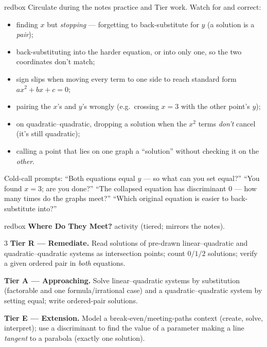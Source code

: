 \documentclass[10pt]{article}
\begin{document}
\begin{skillbox}{redbox}
Circulate during the notes practice and Tier work. Watch for and correct:
\begin{itemize}[leftmargin=1.2em, nosep]
  \item finding $x$ but \emph{stopping} --- forgetting to back-substitute for $y$ (a solution is a \emph{pair});
  \item back-substituting into the harder equation, or into only one, so the two coordinates don't match;
  \item sign slips when moving every term to one side to reach standard form $ax^2+bx+c=0$;
  \item pairing the $x$'s and $y$'s wrongly (e.g.\ crossing $x=3$ with the other point's $y$);
  \item on quadratic--quadratic, dropping a solution when the $x^2$ terms \emph{don't} cancel (it's still quadratic);
  \item calling a point that lies on one graph a ``solution'' without checking it on the \emph{other}.
\end{itemize}
Cold-call prompts: ``Both equations equal $y$ --- so what can you set equal?'' ``You found $x=3$; are you done?''
``The collapsed equation has discriminant $0$ --- how many times do the graphs meet?'' ``Which original equation is
easier to back-substitute into?''
\end{skillbox}

\begin{skillbox}{redbox}
\textbf{Where Do They Meet?} activity (tiered; mirrors the notes).
\begin{multicols}{3}
\textbf{Tier R --- Remediate.} Read solutions of pre-drawn linear--quadratic and quadratic--quadratic systems as
intersection points; count $0/1/2$ solutions; verify a given ordered pair in \emph{both} equations.

\columnbreak
\textbf{Tier A --- Approaching.} Solve linear--quadratic systems by substitution (factorable and one
formula/irrational case) and a quadratic--quadratic system by setting equal; write ordered-pair solutions.

\columnbreak
\textbf{Tier E --- Extension.} Model a break-even/meeting-paths context (create, solve, interpret); use a
discriminant to find the value of a parameter making a line \emph{tangent} to a parabola (exactly one solution).
\end{multicols}
\end{skillbox}
\end{document}
